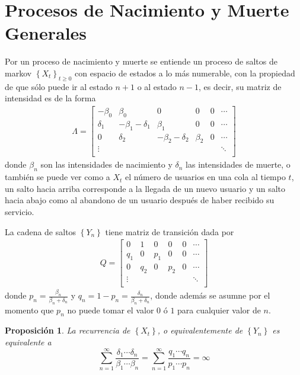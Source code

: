 \documentclass{article}
\newtheorem{Prop}{Proposición}[section]
\numberwithin{equation}{section}
\begin{document}
\section{Procesos de Nacimiento y Muerte Generales}

Por un proceso de nacimiento y muerte se entiende un proceso de saltos de markov $\left\{X_{t}\right\}_{t\geq0}$ con espacio de estados a lo m\'as numerable, con la propiedad de que s\'olo puede ir al estado $n+1$ o al estado $n-1$, es decir, su matriz de intensidad es de la forma
\begin{eqnarray*}
\Lambda=\left[\begin{array}{cccccc}
-\beta_{0} & \beta_{0} & 0 &0 &0& \cdots\\
\delta_{1} & -\beta_{1}-\delta_{1} & \beta_{1} & 0 & 0 &\cdots\\
0 & \delta_{2} & -\beta_{2}-\delta_{2} & \beta_{2} & 0 &\cdots\\
\vdots & & & & & \ddots\\
\end{array}\right]
\end{eqnarray*}
donde $\beta_{n}$ son las intensidades de nacimiento y $\delta_{n}$ las intensidades de muerte, o tambi\'en se puede ver como a $X_{t}$ el n\'umero de usuarios en una cola al tiempo $t$, un salto hacia arriba corresponde a la llegada de un nuevo usuario y un salto hacia abajo como al abandono de un usuario despu\'es de haber recibido su servicio.

La cadena de saltos $\left\{Y_{n}\right\}$ tiene matriz de transici\'on dada por
\begin{eqnarray*}
Q=\left[\begin{array}{cccccc}
0 & 1 & 0 &0 &0& \cdots\\
q_{1} & 0 & p_{1} & 0 & 0 &\cdots\\
0 & q_{2} & 0 & p_{2} & 0 &\cdots\\
\vdots & & & & & \ddots\\
\end{array}\right]
\end{eqnarray*}
donde $p_{n}=\frac{\beta_{n}}{\beta_{n}+\delta_{n}}$ y $q_{n}=1-p_{n}=\frac{\delta_{n}}{\beta_{n}+\delta_{n}}$, donde adem\'as se asumne por el momento que $p_{n}$ no puede tomar el valor $0$ \'o $1$ para cualquier valor de $n$.

\begin{Prop}\label{Prop.2.1}
La recurrencia de $\left\{X_{t}\right\}$, o equivalentemente de $\left\{Y_{n}\right\}$ es equivalente a
\begin{equation}\label{Eq.2.1}
\sum_{n=1}^{\infty}\frac{\delta_{1}\cdots\delta_{n}}{\beta_{1}\cdots\beta_{n}}=\sum_{n=1}^{\infty}\frac{q_{1}\cdots q_{n}}{p_{1}\cdots p_{n}}=\infty
\end{equation}
\end{Prop}
\end{document}
